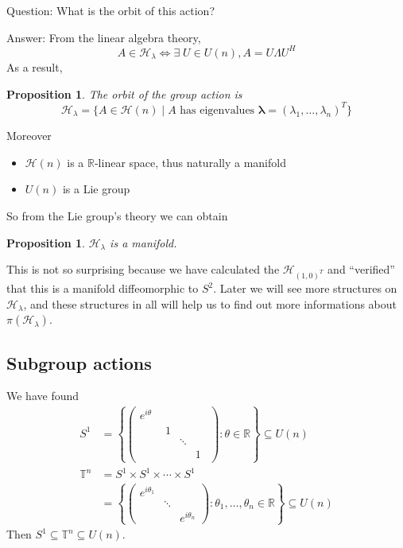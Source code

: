\documentclass[11pt]{amsart}
\numberwithin{equation}{section}
\theoremstyle{plain}
\newtheorem{proposition}[theorem]{Proposition}
\theoremstyle{plain}
\numberwithin{equation}{section}
\theoremstyle{remark}
\begin{document}
Question: What is the orbit of this action?

Answer: From the linear algebra theory,
$$A \in \mathcal{H}_\lambda \Leftrightarrow \exists \; U \in U(n), A=U\Lambda U^H$$
As a result,
\begin{proposition}
	The orbit  of the group action is
	$$\mathcal{H}_\lambda=\{A \in \mathcal{H}(n) \mid A \text{ has eigenvalues } \bm{\lambda} = (\lambda_1,\ldots,\lambda_n)^T\}$$
\end{proposition}

Moreover 
	\begin{itemize}
	\item $\mathcal{H}(n)$ is a $\mathbb{R}$-linear space, thus naturally a manifold
	\item $U(n)$ is a Lie group
\end{itemize}

So from the Lie group’s theory we can obtain
\begin{proposition}
	$\mathcal{H}_\lambda$ is a manifold.
\end{proposition}

This is not so surprising because we have calculated
the $\mathcal{H}_{(1,0)^T}$ and “verified” that this is a manifold diffeomorphic to $S^2$.
Later we will see more structures on $\mathcal{H}_\lambda$, and these structures in all will help us to find out more informations about $\pi (\mathcal{H}_\lambda)$.

 
\subsection{Subgroup  actions}
We have found
 $$ $$
\begin{equation*}
	\begin{aligned}
	S^1&= \left\{ 
	\begin{pmatrix}
	e^{i\theta}&\\
	&\begin{smallmatrix}
	1&&\\
	&\ddots&\\
	&&1
	\end{smallmatrix}
	\end{pmatrix}
	: \theta \in \mathbb{R}
	\right\} \subseteq U(n)\\	
	\mathbb{T}^n&=S^1 \times S^1 \times \cdots \times S^1\\
	&=\left\{ 
	\begin{pmatrix}
	e^{i\theta_1}&&\\
	&\ddots&\\
	&&e^{i\theta_n}
	\end{pmatrix}
	: \theta_1,\ldots, \theta_n \in \mathbb{R}
	\right\} \subseteq U(n)
	\end{aligned}
\end{equation*}
 Then $S^1 \subseteq \mathbb{T}^n \subseteq U(n)$.
 
\end{document}
